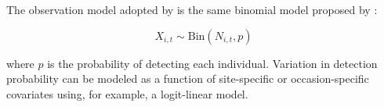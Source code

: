 \documentclass[12pt,english]{article}
\begin{document}
\begin{spacing}{1.9}
\begin{flushleft}
The observation model adopted by \citet{dail_madsen:2011} is the same
binomial model proposed by \citet{royle:2004biom}: %
\begin{linenomath*}
\begin{equation}
  X_{i,t} \sim \mathrm{Bin}(N_{i,t}, p)
  \label{eq:p1}
\end{equation}
\end{linenomath*}
where $p$ is the probability of detecting each individual. Variation
in detection probability can be modeled as a function of site-specific
or occasion-specific covariates using, for example, a logit-linear model.




\end{flushleft}
\end{spacing}
\end{document}

